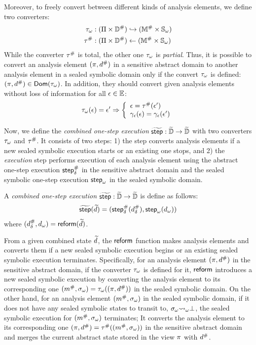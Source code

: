 Moreover, to freely convert between different kinds of analysis elements, we define two converters:
\begin{align}
  {\tau}_\omega & : (\Pi \times {\mathbb{D}}^{\#}) \hookrightarrow
    ({\mathbb{M}}^{\#} \times {\mathbb{S}}_\omega)\\
  {\tau}^{\#} & : (\Pi \times
    {\mathbb{D}}^{\#}) \leftarrow ({\mathbb{M}}^{\#} \times {\mathbb{S}}_\omega)
\end{align}
While the converter ${\tau}^{\#}$ is total, the other one ${\tau}_\omega$ is
\textit{partial}. Thus, it is possible to convert an analysis element
$(\pi, {d}^{\#})$ in a sensitive abstract domain to another analysis element in
a sealed symbolic domain only if the convert ${\tau}_\omega$ is defined: $(\pi,
{d}^{\#}) \in \textsf{Dom}({\tau}_\omega)$.  In addition, they should convert given
analysis elements without loss of information for all $\epsilon \in \mathbb{E}$:
\[
  {\tau}_\omega(\epsilon) = \epsilon' \Rightarrow \left\{
  \begin{array}{l}
    \epsilon = {\tau}^{\#}(\epsilon')\\
    \gamma_{\epsilon}(\epsilon) = \gamma_{\epsilon}(\epsilon')\\
  \end{array}
  \right.
\]

Now, we define the \textit{combined one-step execution} $\widetilde{\textsf{step}}: \widetilde{\mathbb{D}}
\rightarrow \widetilde{\mathbb{D}}$ with two converters ${\tau}_\omega$ and ${\tau}^{\#}$.
It consists of two steps: 1) the \textit{\triagename} step converts
analysis elements if a new sealed symbolic execution starts or an
existing one stops, and 2) the \textit{execution} step performs execution of each
analysis element using the abstract one-step execution ${\textsf{step}}^{\#}_\delta$ in the sensitive
abstract domain and the sealed symbolic one-step execution ${\textsf{step}}_\omega$ in the sealed
symbolic domain.
\begin{definition}
A \textit{combined one-step execution} $\widetilde{\textsf{step}}: \widetilde{\mathbb{D}} \rightarrow
\widetilde{\mathbb{D}}$ is define as follows:
  \[
    \widetilde{\textsf{step}}(\widetilde{d}) = ({\textsf{step}}^{\#}_\delta({{d}^{\#}_\delta}), {\textsf{step}}_\omega({{d}_\omega}))
  \]
where $({{d}^{\#}_\delta}, {{d}_\omega}) = \textsf{reform}(\widetilde{d})$.
\end{definition}

From a given combined state $\widetilde{d}$, the $\textsf{reform}$ function makes analysis elements
and converts them if a new sealed symbolic execution
begins or an existing sealed symbolic execution terminates.
Specifically, for an analysis element $(\pi, {d}^{\#})$ in the sensitive abstract domain,
if the converter ${\tau}_\omega$ is defined for it, $\textsf{reform}$ introduces a new sealed symbolic execution
by converting the analysis element to its corresponding one $({m}^{\#}, {\sigma}_\omega) =
{\tau}_\omega((\pi, {d}^{\#}))$ in the sealed symbolic domain.
On the other hand, for an analysis element $({m}^{\#}, {\sigma}_\omega)$ in the sealed symbolic domain,
if it does not have any sealed symbolic states to transit to, ${\sigma}_\omega {\leadsto}_\omega \bot$,
the sealed symbolic execution for $({m}^{\#}, {\sigma}_\omega)$ terminates;
It converts the analysis element to its corresponding one $(\pi, {d}^{\#}) =
{\tau}^{\#}(({m}^{\#}, {\sigma}_\omega))$ in the sensitive abstract domain and
merges the current abstract state stored in the view $\pi$ with ${d}^{\#}$.

